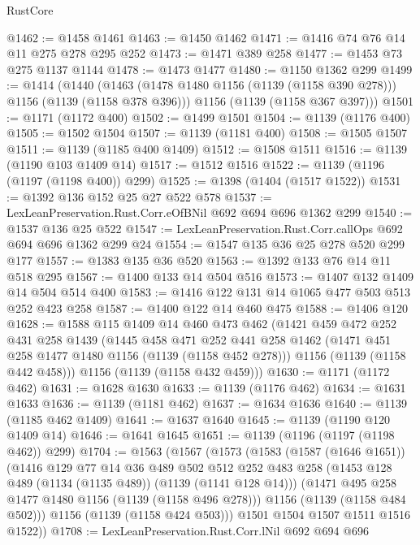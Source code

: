 \begin{lexlean}{RustCore}
\begin{coremodule}
@1462 := @1458 @1461
@1463 := @1450 @1462
@1471 := @1416 @74 @76 @14 @11 @275 @278 @295 @252
@1473 := @1471 @389 @258
@1477 := @1453 @73 @275 @1137 @1144
@1478 := @1473 @1477
@1480 := @1150 @1362 @299
@1499 := @1414
    (@1440
      (@1463 (@1478 @1480 @1156 (@1139 (@1158 @390 @278))) @1156 (@1139 (@1158 @378 @396)))
      @1156
      (@1139 (@1158 @367 @397)))
@1501 := @1171 (@1172 @400)
@1502 := @1499 @1501
@1504 := @1139 (@1176 @400)
@1505 := @1502 @1504
@1507 := @1139 (@1181 @400)
@1508 := @1505 @1507
@1511 := @1139 (@1185 @400 @1409)
@1512 := @1508 @1511
@1516 := @1139 (@1190 @103 @1409 @14)
@1517 := @1512 @1516
@1522 := @1139 (@1196 (@1197 (@1198 @400)) @299)
@1525 := @1398 (@1404 (@1517 @1522))
@1531 := @1392 @136 @152 @25 @27 @522 @578
@1537 := LexLeanPreservation.Rust.Corr.eOfBNil @692 @694 @696 @1362 @299
@1540 := @1537 @136 @25 @522
@1547 := LexLeanPreservation.Rust.Corr.callOps @692 @694 @696 @1362 @299 @24
@1554 := @1547 @135 @36 @25 @278 @520 @299 @177
@1557 := @1383 @135 @36 @520
@1563 := @1392 @133 @76 @14 @11 @518 @295
@1567 := @1400 @133 @14 @504 @516
@1573 := @1407 @132 @1409 @14 @504 @514 @400
@1583 := @1416 @122 @131 @14 @1065 @477 @503 @513 @252 @423 @258
@1587 := @1400 @122 @14 @460 @475
@1588 := @1406 @120
@1628 := @1588
    @115
    @1409
    @14
    @460
    @473
    @462
    (@1421
      @459
      @472
      @252
      @431
      @258
      @1439
      (@1445
        @458
        @471
        @252
        @441
        @258
        @1462
        (@1471 @451 @258 @1477 @1480 @1156 (@1139 (@1158 @452 @278)))
        @1156
        (@1139 (@1158 @442 @458)))
      @1156
      (@1139 (@1158 @432 @459)))
@1630 := @1171 (@1172 @462)
@1631 := @1628 @1630
@1633 := @1139 (@1176 @462)
@1634 := @1631 @1633
@1636 := @1139 (@1181 @462)
@1637 := @1634 @1636
@1640 := @1139 (@1185 @462 @1409)
@1641 := @1637 @1640
@1645 := @1139 (@1190 @120 @1409 @14)
@1646 := @1641 @1645
@1651 := @1139 (@1196 (@1197 (@1198 @462)) @299)
@1704 := @1563
    (@1567
      (@1573
        (@1583
          (@1587 (@1646 @1651))
          (@1416
            @129
            @77
            @14
            @36
            @489
            @502
            @512
            @252
            @483
            @258
            (@1453 @128 @489 (@1134 (@1135 @489)) (@1139 (@1141 @128 @14)))
            (@1471 @495 @258 @1477 @1480 @1156 (@1139 (@1158 @496 @278)))
            @1156
            (@1139 (@1158 @484 @502)))
          @1156
          (@1139 (@1158 @424 @503)))
        @1501
        @1504
        @1507
        @1511
        @1516
        @1522))
@1708 := LexLeanPreservation.Rust.Corr.lNil @692 @694 @696

\end{coremodule}
\end{lexlean}
